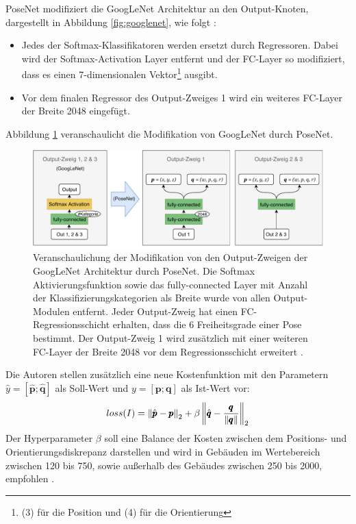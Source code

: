 PoseNet modifiziert die GoogLeNet Architektur an den Output-Knoten, dargestellt in Abbildung \ref{fig:googlenet}, wie folgt \cite{kendallPoseNetConvolutionalNetwork2015}:
\begin{itemize}
	\item Jedes der Softmax-Klassifikatoren werden ersetzt durch Regressoren. Dabei wird der Softmax-Activation Layer entfernt und der FC-Layer so modifiziert, dass es einen 7-dimensionalen Vektor\footnote{(3) für die Position und (4) für die Orientierung} ausgibt.
	\item Vor dem finalen Regressor des Output-Zweiges 1 wird ein weiteres FC-Layer der Breite 2048 eingefügt.

\end{itemize}
Abbildung \ref{fig:posenet_mods} veranschaulicht die Modifikation von GoogLeNet durch PoseNet.
\vspace*{1.2cm}
 \begin{figure}[H]
	\centering
	\includegraphics[width=\textwidth]{images/googlenet/posenet_diagram2.pdf}
	\caption{Veranschaulichung der Modifikation von den Output-Zweigen der GoogLeNet Architektur durch PoseNet. Die Softmax Aktivierungsfunktion sowie das fully-connected Layer mit Anzahl der Klassifizierungskategorien als Breite wurde von allen Output-Modulen entfernt. Jeder Output-Zweig hat einen FC-Regressionsschicht erhalten, dass die 6 Freiheitsgrade einer Pose bestimmt. Der Output-Zweig 1 wird zusätzlich mit einer weiteren FC-Layer der Breite 2048 vor dem Regressionsschicht erweitert \cite{kendallPoseNetConvolutionalNetwork2015}.}
	\label{fig:posenet_mods}
\end{figure}
\vspace*{1.5cm}

Die Autoren \citet{kendallPoseNetConvolutionalNetwork2015} stellen zusätzlich eine neue Kostenfunktion mit den Parametern $\hat{y} = [\hat{\pmb{p}};\hat{\pmb{q}}]$ als Soll-Wert und $y = [\pmb{p};\pmb{q}]$ als Ist-Wert vor:
\begin{equation}
	\label{eq:posenet_loss}
	loss(I) = \left\lVert \hat{\pmb{p}} - \pmb{p} \right\rVert_2 + \beta \left\lVert \hat{\pmb{q}} - \frac{\pmb{q}}{\left\lVert\pmb{q}\right\rVert}\right\rVert_2
\end{equation}
Der Hyperparameter $\beta$ soll eine Balance der Kosten zwischen dem Positions- und Orientierungsdiskrepanz darstellen und wird in Gebäuden im Wertebereich zwischen 120 bis 750, sowie außerhalb des Gebäudes zwischen 250 bis 2000, empfohlen \cite{kendallPoseNetConvolutionalNetwork2015}. 